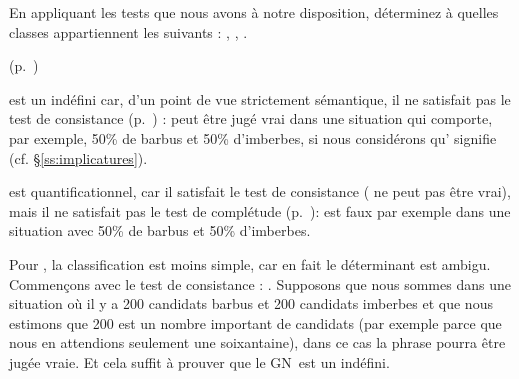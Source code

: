 \begin{exo}\label{exo:CatGN}
En appliquant les tests que nous avons à notre disposition, 
%
déterminez à quelles classes appartiennent les {\GN} suivants : , , .
\begin{solu}(p.~\pageref{exo:CatGN})\label{crg:CatGN}

 est un indéfini car, d'un point de vue strictement sémantique, il ne satisfait pas le test de consistance (p.~\pageref{test:contra}) :  peut être jugé vrai dans une situation qui comporte, par exemple, 50\% de barbus et 50\% d'imberbes, si nous considérons qu' signifie  (cf. \S\ref{ss:implicatures}).

 est quantificationnel, car il satisfait le test de consistance ( ne peut pas être vrai), mais il ne satisfait pas le test de complétude (p.~\pageref{test:compl}):  est faux par exemple dans une situation avec 50\% de barbus et 50\% d'imberbes.

Pour , la classification est moins simple, car en fait le déterminant est ambigu.  Commençons avec le test de consistance : .  Supposons que nous sommes dans une situation où il y a 200 candidats barbus et 200 candidats imberbes et que nous estimons que 200 est un nombre important de candidats (par exemple parce que nous en attendions seulement une soixantaine), dans ce cas la phrase pourra être jugée vraie.  Et cela suffit à prouver que le GN\ est un indéfini.  


\end{solu}
\end{exo}
